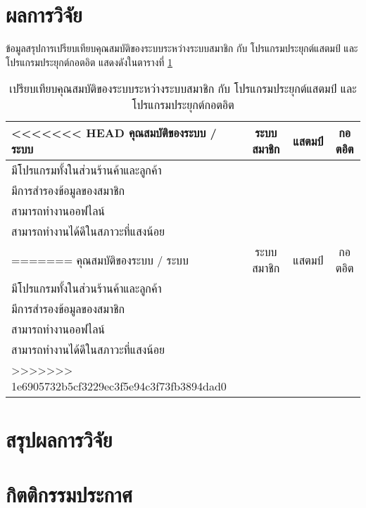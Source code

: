 \documentclass[12pt,a4paper,twocolumn]{article}
\newcommand{\cmark}{\ding{51}}
\newcommand{\xmark}{\ding{55}}
\begin{document}
\section{ผลการวิจัย}

ข้อมูลสรุปการเปรียบเทียบคุณสมบัติของระบบระหว่างระบบสมาชิก กับ โปรแกรมประยุกต์แสตมป์ และโปรแกรมประยุกต์กอตอิต แสดงดังในตารางที่ \ref{tab:compare_feature}

\begin{table}[ht!]
\centering
\resizebox{81mm}{!} {
\begin{tabular}{ | l | c | c | c |}
	\hline                        
<<<<<<< HEAD
  	คุณสมบัติของระบบ / ระบบ            	& ระบบสมาชิก & แสตมป์ & กอตอิต \\
  	\hline 
  	มีโปรแกรมทั้งในส่วนร้านค้าและลูกค้า 		& \cmark & \xmark & \xmark \\
  	\hline
  	มีการสำรองข้อมูลของสมาชิก				& \cmark & \cmark & \cmark \\
  	\hline
  	สามารถทำงานออฟไลน์                 	& \cmark & \cmark & \cmark \\
  	\hline
  	สามารถทำงานได้ดีในสภาวะที่แสงน้อย    	& \cmark & \cmark & \xmark \\
=======
  	คุณสมบัติของระบบ / ระบบ            & ระบบสมาชิก & แสตมป์ & กอตอิต \\
  	\hline 
  	มีโปรแกรมทั้งในส่วนร้านค้าและลูกค้า 		& \cmark & \xmark & \xmark \\
  	\hline
  	มีการสำรองข้อมูลของสมาชิก				    & \cmark & \cmark & \cmark \\
  	\hline
  	สามารถทำงานออฟไลน์                 & \cmark & \cmark & \cmark \\
  	\hline
  	สามารถทำงานได้ดีในสภาวะที่แสงน้อย    & \cmark & \cmark & \xmark \\
>>>>>>> 1e6905732b5cf3229ec3f5e94c3f73fb3894dad0
  	\hline
\end{tabular}
}
\caption{เปรียบเทียบคุณสมบัติของระบบระหว่างระบบสมาชิก กับ โปรแกรมประยุกต์แสตมป์ และโปรแกรมประยุกต์กอตอิต}
\label{tab:compare_feature}
\end{table}

\section{สรุปผลการวิจัย}

\section{กิตติกรรมประกาศ}
\end{document}
